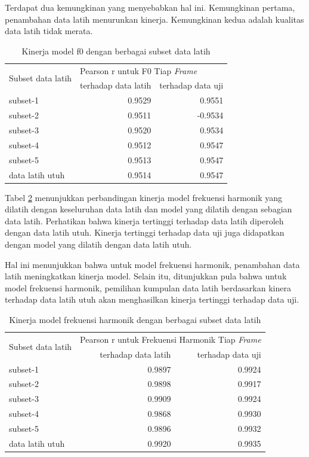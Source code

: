 Terdapat dua kemungkinan yang menyebabkan hal ini. Kemungkinan pertama, penambahan data latih menurunkan kinerja. Kemungkinan kedua adalah kualitas data latih tidak merata.

\begin{table}[htbp]
    \centering
    \caption{Kinerja model f0 dengan berbagai subset data latih}\label{tab-f0-model-subset-results}
    \begin{tabular}{ |l|r|r| } 
     \hline
     \multirow{2}{*}{Subset data latih} & \multicolumn{2}{l|}{Pearson r untuk F0 Tiap \textit{Frame}} \\
     \cline{2-3}
     & terhadap data latih & terhadap data uji \\\hline
	subset-1          &0.9529  & 0.9551\\\hline
	subset-2          &0.9511  &-0.9534\\\hline
	subset-3          &0.9520  &0.9534\\\hline
	subset-4          &0.9512  &0.9547\\\hline
	subset-5          &0.9513  &0.9547\\\hline
	data latih utuh			 &0.9514  &0.9547\\\hline
    \end{tabular}
\end{table}

Tabel \ref{tab-freq-model-subset-results} menunjukkan  perbandingan kinerja model frekuensi harmonik yang dilatih dengan keseluruhan data latih dan model yang dilatih dengan sebagian data latih. Perhatikan bahwa kinerja tertinggi terhadap data latih diperoleh dengan data latih utuh. Kinerja tertinggi terhadap data uji juga didapatkan dengan model yang dilatih dengan data latih utuh. 

Hal ini menunjukkan bahwa untuk model frekuensi harmonik, penambahan data latih meningkatkan kinerja model. Selain itu, ditunjukkan pula bahwa untuk model frekuensi harmonik, pemilihan kumpulan data latih berdasarkan kinera terhadap data latih utuh akan menghasilkan kinerja tertinggi terhadap data uji.

\begin{table}[htbp]
    \centering
    \caption{Kinerja model frekuensi harmonik dengan berbagai subset data latih}\label{tab-freq-model-subset-results}
    \begin{tabular}{ |l|r|r| } 
     \hline
     \multirow{2}{*}{Subset data latih} & \multicolumn{2}{l|}{Pearson r untuk Frekuensi Harmonik Tiap \textit{Frame}} \\
     \cline{2-3}
     & terhadap data latih & terhadap data uji \\\hline
	subset-1      &0.9897  &0.9924\\\hline
	subset-2      &0.9898  &0.9917\\\hline
	subset-3      &0.9909  &0.9924\\\hline
	subset-4      &0.9868  &0.9930\\\hline
	subset-5      &0.9896  &0.9932\\\hline
	data latih utuh      &0.9920  &0.9935\\\hline
    \end{tabular}
\end{table}

